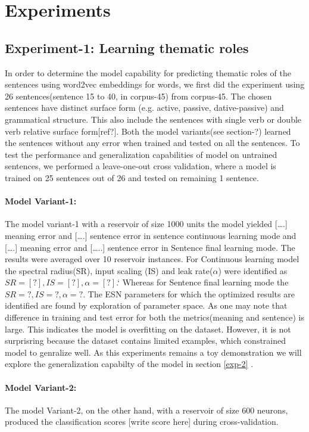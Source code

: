 \section{Experiments}

\subsection{Experiment-1: Learning thematic roles}

In order to determine the model capability for predicting thematic roles of the sentences using word2vec embeddings for words, we first did the experiment using 26 sentences(sentence 15 to 40, in corpus-45) from corpus-45. The chosen sentences have distinct surface form (e.g. active, passive, dative-passive) and grammatical structure. This also include the sentences with single verb or double verb relative surface form[ref?]. Both the model variants(see section-?) learned the sentences without any error when trained and tested on all the sentences. To test the performance and generalization capabilities of model on untrained sentences, we performed a leave-one-out cross validation, where a model is trained on 25 sentences out of 26 and tested on remaining 1 sentence.

\paragraph{Model Variant-1:} The model variant-1 with a reservoir of size 1000 units the model yielded [….] meaning error and [….] sentence error in sentence continuous learning mode and [….] meaning error and […..] sentence error in Sentence final learning mode. The results were averaged over 10 reservoir instances. For Continuous learning model the spectral radius(SR), input scaling (IS) and leak rate($\alpha$) were identified as $SR=[?], IS=[?], \alpha=[?]$.` Whereas for Sentence final learning mode the $SR=?, IS=?, \alpha=?$. The ESN parameters for which the optimized results are identified are found by exploration of parameter space. As one may note that difference in training and test error for both the metrics(meaning and sentence) is large. This indicates the model is overfitting on the dataset. However, it is not surprisring because the dataset contains limited examples, which constrained model to genralize well. As this experiments remains a toy demonstration we will explore the generalization capabilty of the model in section \ref{exp-2} .

\paragraph{Model Variant-2:} The model Variant-2, on the other hand, with a reservoir of size 600 neurons, produced the classification scores [write score here] during cross-validation. 

